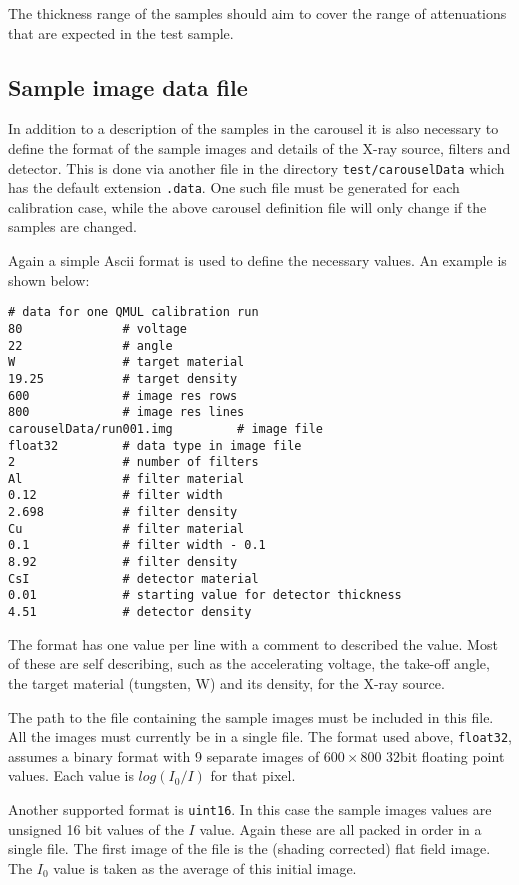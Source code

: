 \documentclass[a4paper]{article}
\begin{document}
The thickness range of the samples should aim to cover the range of attenuations that are expected in the test sample.

\subsection{Sample image data file}

In addition to a description of the samples in the carousel it is also necessary to define the format of the sample
images and details of the X-ray source, filters and detector.
This is done via another file in the directory \texttt{test/carouselData} which has the default extension \texttt{.data}.
One such file must be generated for each calibration case, while the above carousel definition file will only change
if the samples are changed.

Again a simple Ascii format is used to define the necessary values.
An example is shown below:
\begin{verbatim}
# data for one QMUL calibration run
80              # voltage
22              # angle
W               # target material
19.25           # target density
600             # image res rows
800             # image res lines
carouselData/run001.img         # image file
float32         # data type in image file
2               # number of filters
Al              # filter material
0.12            # filter width
2.698           # filter density
Cu              # filter material
0.1             # filter width - 0.1
8.92            # filter density
CsI             # detector material
0.01            # starting value for detector thickness
4.51            # detector density
\end{verbatim}

The format has one value per line with a comment to described the value.
Most of these are self describing, such as the accelerating voltage, the take-off angle,
the target material (tungsten, W) and its density, for the X-ray source.

The path to the file containing the sample images must be included in this file.
All the images must currently be in a single file.
The format used above, \texttt{float32}, assumes a binary format with 9 separate images of $600 \times 800$ 32bit floating
point values.
Each value is $log ( I_0 / I )$ for that pixel.

Another supported format is \texttt{uint16}. In this case the sample images values are unsigned 16 bit values of the $I$ value.
Again these are all packed in order in a single file. The first image of the file is the (shading corrected) flat field image.
The $I_0$ value is taken as the average of this initial image.
 
\end{document}
